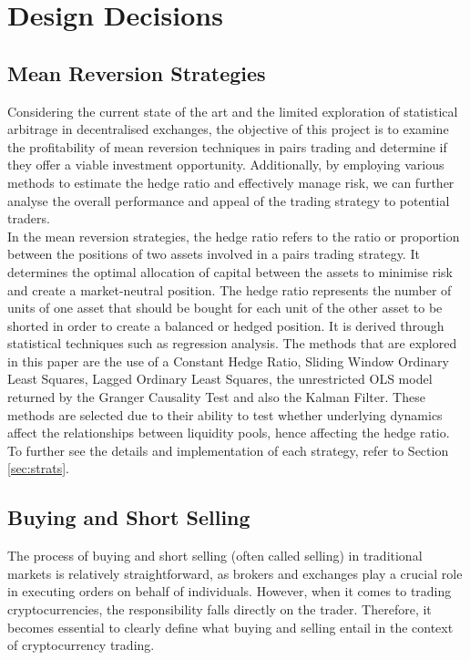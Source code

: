 \chapter{Design Decisions}

\section{Mean Reversion Strategies}
Considering the current state of the art and the limited exploration of statistical arbitrage in decentralised exchanges, the objective of this project is to examine the profitability of mean reversion techniques in pairs trading and determine if they offer a viable investment opportunity. Additionally, by employing various methods to estimate the hedge ratio and effectively manage risk, we can further analyse the overall performance and appeal of the trading strategy to potential traders.
\\[3mm]
In the mean reversion strategies, the hedge ratio refers to the ratio or proportion between the positions of two assets involved in a pairs trading strategy. It determines the optimal allocation of capital between the assets to minimise risk and create a market-neutral position. The hedge ratio represents the number of units of one asset that should be bought for each unit of the other asset to be shorted in order to create a balanced or hedged position. It is derived through statistical techniques such as regression analysis. The methods that are explored in this paper are the use of a Constant Hedge Ratio, Sliding Window Ordinary Least Squares, Lagged Ordinary Least Squares, the unrestricted OLS model returned by the Granger Causality Test and also the Kalman Filter. These methods are selected due to their ability to test whether underlying dynamics affect the relationships between liquidity pools, hence affecting the hedge ratio. To further see the details and implementation of each strategy, refer to Section \ref{sec:strats}.

\section{Buying and Short Selling}
\label{sec:buying-selling}
The process of buying and short selling (often called selling) in traditional markets is relatively straightforward, as brokers and exchanges play a crucial role in executing orders on behalf of individuals. However, when it comes to trading cryptocurrencies, the responsibility falls directly on the trader. Therefore, it becomes essential to clearly define what buying and selling entail in the context of cryptocurrency trading.

